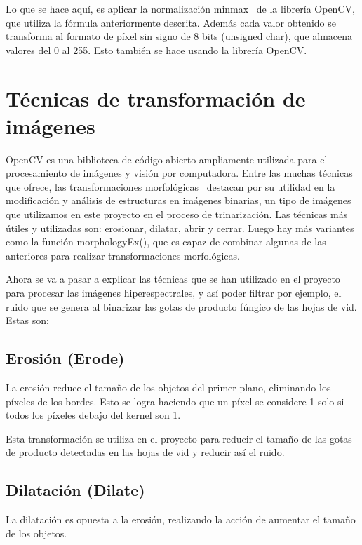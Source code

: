  Lo que se hace aquí, es aplicar la normalización minmax~\cite{fscaling} de la librería OpenCV, que utiliza la fórmula anteriormente descrita. Además cada valor obtenido se transforma al formato de píxel sin signo de 8 bits (unsigned char), que almacena valores del 0 al 255. Esto también se hace usando la librería OpenCV.

\section{Técnicas de transformación de imágenes}
OpenCV es una biblioteca de código abierto ampliamente utilizada para el procesamiento de imágenes y visión por computadora. Entre las muchas técnicas que ofrece, las transformaciones morfológicas~\cite{morfo} destacan por su utilidad en la modificación y análisis de estructuras en imágenes binarias, un tipo de imágenes que utilizamos en este proyecto en el proceso de trinarización. Las técnicas más útiles y utilizadas son: erosionar, dilatar, abrir y cerrar. Luego hay más variantes como la función morphologyEx(), que es capaz de combinar algunas de las anteriores para realizar transformaciones morfológicas.


Ahora se va a pasar a explicar las técnicas que se han utilizado en el proyecto para procesar las imágenes hiperespectrales, y así poder filtrar  por ejemplo, el ruido que se genera al binarizar las gotas de producto fúngico de las hojas de vid. Estas son:

\subsection{Erosión (Erode)}
La erosión reduce el tamaño de los objetos del primer plano, eliminando los píxeles de los bordes. Esto se logra haciendo que un píxel se considere 1 solo si todos los píxeles debajo del kernel son 1. 


Esta transformación se utiliza en el proyecto para reducir el tamaño de las gotas de producto detectadas en las hojas de vid y reducir así el ruido.

\subsection{Dilatación (Dilate)}
La dilatación es opuesta a la erosión, realizando la acción de aumentar el tamaño de los objetos. 

